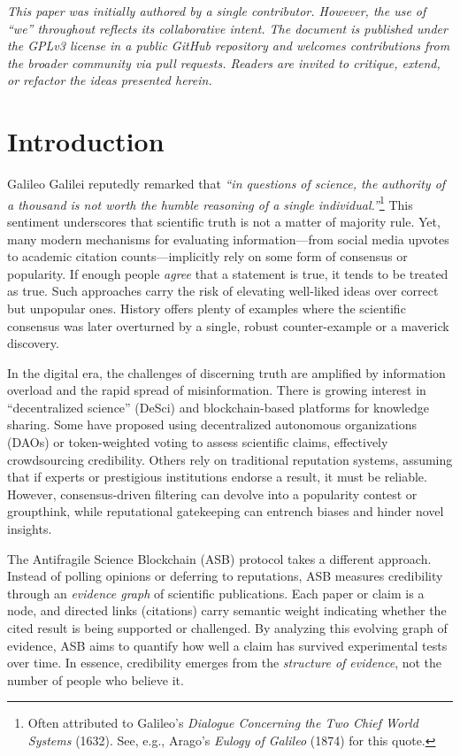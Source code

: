 \documentclass{article}
\begin{document}
\textit{This paper was initially authored by a single contributor. However, the use of “we” throughout reflects its collaborative intent. The document is published under the GPLv3 license in a public GitHub repository and welcomes contributions from the broader community via pull requests. Readers are invited to critique, extend, or refactor the ideas presented herein.}

\section{Introduction}
Galileo Galilei reputedly remarked that \emph{``in questions of science, the authority of a thousand is not worth the humble reasoning of a single individual.''}\footnote{Often attributed to Galileo's \emph{Dialogue Concerning the Two Chief World Systems} (1632). See, e.g., Arago's \emph{Eulogy of Galileo} (1874) for this quote.} This sentiment underscores that scientific truth is not a matter of majority rule. Yet, many modern mechanisms for evaluating information---from social media upvotes to academic citation counts---implicitly rely on some form of consensus or popularity. If enough people \emph{agree} that a statement is true, it tends to be treated as true. Such approaches carry the risk of elevating well-liked ideas over correct but unpopular ones. History offers plenty of examples where the scientific consensus was later overturned by a single, robust counter-example or a maverick discovery.

In the digital era, the challenges of discerning truth are amplified by information overload and the rapid spread of misinformation. There is growing interest in ``decentralized science'' (DeSci) and blockchain-based platforms for knowledge sharing. Some have proposed using decentralized autonomous organizations (DAOs) or token-weighted voting to assess scientific claims, effectively crowdsourcing credibility. Others rely on traditional reputation systems, assuming that if experts or prestigious institutions endorse a result, it must be reliable. However, consensus-driven filtering can devolve into a popularity contest or groupthink, while reputational gatekeeping can entrench biases and hinder novel insights.

The Antifragile Science Blockchain (ASB) protocol takes a different approach. Instead of polling opinions or deferring to reputations, ASB measures credibility through an \emph{evidence graph} of scientific publications. Each paper or claim is a node, and directed links (citations) carry semantic weight indicating whether the cited result is being supported or challenged. By analyzing this evolving graph of evidence, ASB aims to quantify how well a claim has survived experimental tests over time. In essence, credibility emerges from the \emph{structure of evidence}, not the number of people who believe it.
\end{document}
